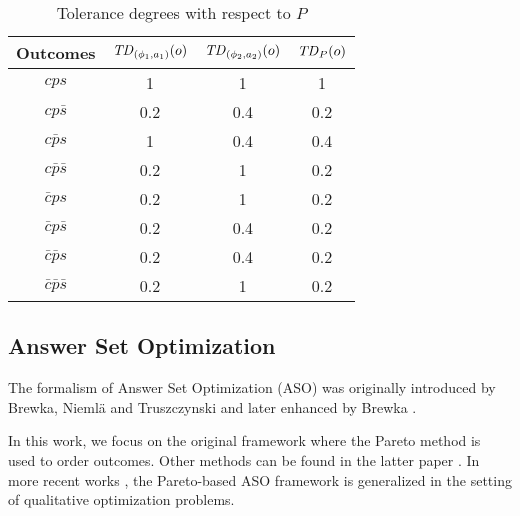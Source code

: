 \begin{table}
  \centering
  \small
  \begin{tabular}{ |c||c|c|c| }
    \hline
    Outcomes                 & $\mathit{TD}_{(\phi_1,a_1)}(o)$  & $\mathit{TD}_{(\phi_2,a_2)}(o)$ & $\mathit{TD}_P(o)$ \\
    \hline \hline
    $cps$    								 & 1    & 1     & 1 \\
    \hline
    $cp\bar{s}$               & 0.2  & 0.4   & 0.2 \\
    \hline
    $c\bar{p} s$              & 1    & 0.4   & 0.4 \\
    \hline
    $c\bar{p}\bar{s}$          & 0.2  & 1     & 0.2 \\
    \hline
    $\bar{c} ps$              & 0.2  & 1     & 0.2 \\
    \hline
    $\bar{c} p\bar{s}$         & 0.2  & 0.4   & 0.2 \\
    \hline
    $\bar{c} \bar{p} s$        & 0.2  & 0.4   & 0.2 \\
    \hline
    $\bar{c} \bar{p} \bar{s}$   & 0.2  & 1     & 0.2 \\
    \hline
  \end{tabular}
  \caption{Tolerance degrees with respect to $P$}
  \label{tbl:poss_ex}
\end{table}


\subsection{Answer Set Optimization}
The formalism of Answer Set Optimization (ASO) was originally introduced by
Brewka, Nieml\"a and Truszczynski \cite{Brewka03answerset} and
later enhanced by Brewka \cite{Brewka04}.

In this work, we focus on the original framework \cite{Brewka03answerset} where 
the Pareto method is used to order outcomes.
Other methods can be found in the latter paper \cite{Brewka04}.
In more recent works \cite{Faber:QOP,Faber:APF}, 
the Pareto-based ASO framework is generalized in the setting of
qualitative optimization problems.

